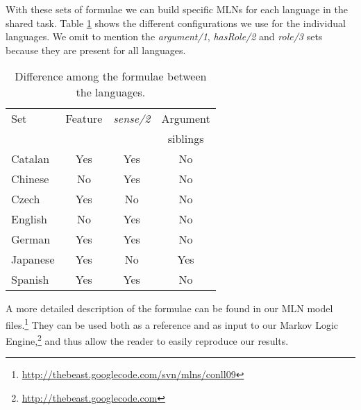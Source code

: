 With these sets of formulae we can build specific MLNs for each language in 
the shared task. Table \ref{tbl:diff} shows the different configurations we use for the individual languages. We 
omit to mention the \emph{argument/1}, \emph{hasRole/2} and \emph{role/3} sets because they 
are present for all languages. 


\begin{table}
\begin{center}
\small
\begin{tabular}{|l|c|c|c|}\hline
    Set         & Feature   & \emph{sense/2}  & Argument \\
                &            &        & siblings  \\\hline\hline
Catalan         &   Yes      &  Yes   &  No  \\
Chinese         &   No       &  Yes   &  No  \\
Czech           &   Yes      &  No    &  No  \\
English         &   No       &  Yes   &  No  \\
German          &   Yes      &  Yes   &  No  \\
Japanese        &   Yes      &  No    &  Yes \\
Spanish         &   Yes      &  Yes   &  No  \\
\hline
\end{tabular}
\caption{Difference among the formulae between the languages.}
\label{tbl:diff}
\normalsize
\end{center}
\end{table}

A more detailed description of the formulae can be found in our MLN model files.\footnote{\url{http://thebeast.googlecode.com/svn/mlns/conll09}} They can be 
used both as a reference and as input to our Markov Logic Engine,\footnote{\url{http://thebeast.googlecode.com}} and thus allow the reader 
to easily reproduce our results.



